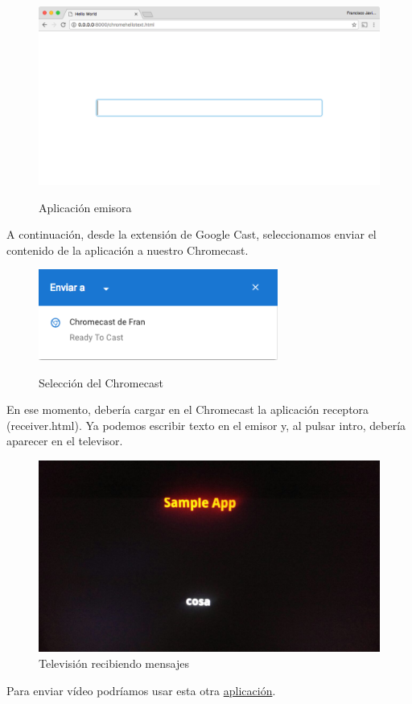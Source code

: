 \begin{figure}[H]
	\centering
	\includegraphics[width=1.1\textwidth]{./Imagenes/emisor1.png}
	\label{fig:fondo}
	\caption{Aplicación emisora}
\end{figure}

A continuación, desde la extensión de Google Cast, seleccionamos enviar el contenido de la aplicación a nuestro Chromecast.

\begin{figure}[H]
	\centering
	\includegraphics[width=0.7\textwidth]{./Imagenes/seleccion.png}
	\label{fig:fondo}
	\caption{Selección del Chromecast}
\end{figure}


En ese momento, debería cargar en el Chromecast la aplicación receptora (receiver.html).
Ya podemos escribir texto en el emisor y, al pulsar intro, debería aparecer en el televisor.


\begin{figure}[H]
	\centering
	\includegraphics[width=1\textwidth]{./Imagenes/receptor.jpg}
	\caption{Televisión recibiendo mensajes}
\end{figure}
	

Para enviar vídeo podríamos usar esta otra \href{https://github.com/googlecast/CastHelloVideo-chrome}{aplicación}.